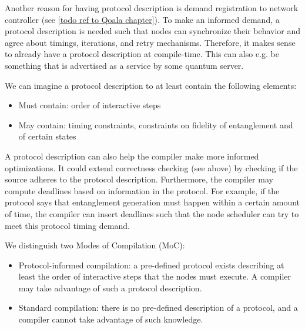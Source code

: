 Another reason for having protocol description is demand registration to network controller (see \ref{todo ref to Qoala chapter}). To make an informed demand, a protocol description is needed such that nodes can synchronize their behavior and agree about timings, iterations, and retry mechanisms. Therefore, it makes sense to already have a protocol description at compile-time. This can also e.g. be something that is advertised as a service by some quantum server.


We can imagine a protocol description to at least contain the following elements:
\begin{itemize}
    \item Must contain: order of interactive steps
    \item May contain: timing constraints, constraints on fidelity of entanglement and of certain states
\end{itemize}

A protocol description can also help the compiler make more informed optimizations.
It could extend correctness checking (see above) by checking if the source adheres to the protocol description. 
Furthermore, the compiler may compute deadlines based on information in the protocol.
For example, if the protocol says that entanglement generation must happen within a certain amount of time, the compiler can insert deadlines such that the node scheduler can try to meet this protocol timing demand.


We distinguish two Modes of Compilation (MoC):
\begin{itemize}
    \item Protocol-informed compilation: a pre-defined protocol exists describing at least the order of interactive steps that the nodes must execute. A compiler may take advantage of such a protocol description.
    \item Standard compilation: there is no pre-defined description of a protocol, and a compiler cannot take advantage of such knowledge.
\end{itemize}





